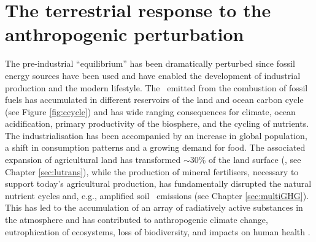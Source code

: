 \section{The terrestrial response to the anthropogenic perturbation}
The pre-industrial ``equilibrium'' has been dramatically perturbed since fossil energy sources have been used and have enabled the development of industrial production and the modern lifestyle. The \coo\ emitted from the combustion of fossil fuels has accumulated in different reservoirs of the land and ocean carbon cycle (see Figure \ref{fig:ccycle}) and has wide ranging consequences for climate, ocean acidification, primary productivity of the biosphere, and the cycling of nutrients. The industrialisation has been accompanied by an increase in global population, a shift in consumption patterns and a growing demand for food. The associated expansion of agricultural land  has transformed $\sim$30\% of the land surface (\citet{hurtt06gcb}, see Chapter \ref{sec:lutrans}), while the production of mineral fertilisers, necessary to support today's agricultural production, has fundamentally disrupted the natural nutrient cycles and, e.g., amplified soil \nno\ emissions (see Chapter \ref{sec:multiGHG}). This has led to the accumulation of an array of radiatively active substances in the atmosphere and has contributed to anthropogenic climate change, eutrophication of ecosystems, loss of biodiversity, and impacts on human health \citep{ena_all}.\\

